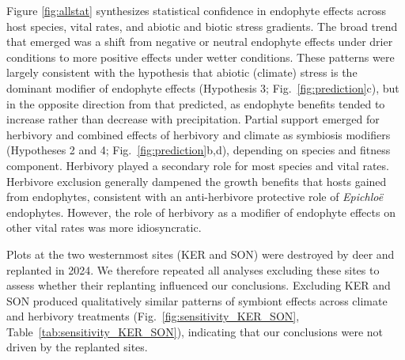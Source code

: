 \documentclass[12pt]{article}\usepackage[]{graphicx}\usepackage[dvipsnames]{xcolor}
\begin{document}

Figure \ref{fig:allstat} synthesizes statistical confidence in endophyte effects across host species, vital rates, and abiotic and biotic stress gradients. 
The broad trend that emerged was a shift from negative or neutral endophyte effects under drier conditions to more positive effects under wetter conditions.
These patterns were largely consistent with the hypothesis that abiotic (climate) stress is the dominant modifier of endophyte effects (Hypothesis 3; Fig.~\ref{fig:prediction}c), but in the opposite direction from that predicted, as endophyte benefits tended to increase rather than decrease with precipitation. 
Partial support emerged for herbivory and combined effects of herbivory and climate as symbiosis modifiers (Hypotheses 2 and 4; Fig.~\ref{fig:prediction}b,d), depending on species and fitness component. 
Herbivory played a secondary role for most species and vital rates. 
Herbivore exclusion generally dampened the growth benefits that hosts gained from endophytes, consistent with an anti-herbivore protective role of \textit{Epichloë} endophytes. 
However, the role of herbivory as a modifier of endophyte effects on  other vital rates was more idiosyncratic. 

Plots at the two westernmost sites (KER and SON) were destroyed by deer and replanted in 2024.
We therefore repeated all analyses excluding these sites to assess whether their replanting influenced our conclusions.
Excluding KER and SON produced qualitatively similar patterns of symbiont effects across climate and herbivory treatments (Fig.~\ref{fig:sensitivity_KER_SON}, Table~\ref{tab:sensitivity_KER_SON}), indicating that our conclusions were not driven by the replanted sites.
\end{document}
